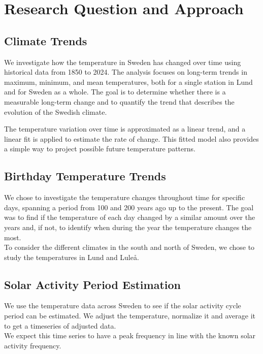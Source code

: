 \section{Research Question and Approach}

\subsection{Climate Trends}

We investigate how the temperature in Sweden has changed over time using historical data from 1850 to 2024. The analysis focuses on long-term trends in maximum, minimum, and mean temperatures, both for a single station in Lund and for Sweden as a whole. The goal is to determine whether there is a measurable long-term change and to quantify the trend that describes the evolution of the Swedish climate.

The temperature variation over time is approximated as a linear trend, and a linear fit is applied to estimate the rate of change. This fitted model also provides a simple way to project possible future temperature patterns.



\subsection{Birthday Temperature Trends}
We chose to investigate the temperature changes throughout time for specific days, spanning a period from 100 and 200 years ago up to the present. The goal was to find if the temperature of each day changed by a similar amount over the years and, if not, to identify when during the year the temperature changes the most. \\

To consider the different climates in the south and north of Sweden, we chose to study the temperatures in Lund and Luleå. 

\subsection{Solar Activity Period Estimation}
We use the temperature data across Sweden to see if the solar activity cycle period can be estimated. We adjust the temperature, normalize it and average it to get a timeseries of adjusted data.\\

We expect this time series to have a peak frequency in line with the known solar activity frequency.